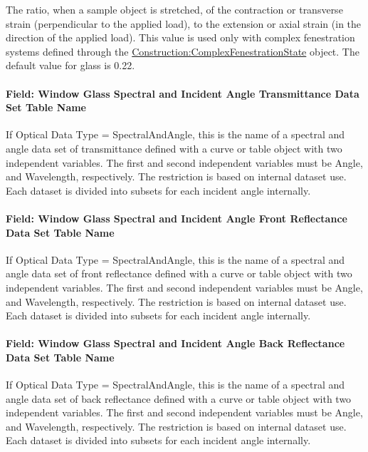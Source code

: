 The ratio, when a sample object is stretched, of the contraction or transverse strain (perpendicular to the applied load), to the extension or axial strain (in the direction of the applied load). This value is used only with complex fenestration systems defined through the \hyperref[constructioncomplexfenestrationstate]{Construction:ComplexFenestrationState} object. The default value for glass is 0.22.

\paragraph{Field: Window Glass Spectral and Incident Angle Transmittance Data Set Table Name}\label{field-window-glass-spectral-and-incident-angle-transmittance-data}

If Optical Data Type = SpectralAndAngle, this is the name of a spectral and angle data set of transmittance defined with a curve or table object with two independent variables. The first and second independent variables must be Angle, and Wavelength, respectively. The restriction is based on internal dataset use. Each dataset is divided into subsets for each incident angle internally.

\paragraph{Field: Window Glass Spectral and Incident Angle Front Reflectance Data Set Table Name}\label{field-window-glass-spectral-and-incident-angle-front-reflectance-data}

If Optical Data Type = SpectralAndAngle, this is the name of a spectral and angle data set of front reflectance defined with a curve or table object with two independent variables. The first and second independent variables must be Angle, and Wavelength, respectively. The restriction is based on internal dataset use. Each dataset is divided into subsets for each incident angle internally.

\paragraph{Field: Window Glass Spectral and Incident Angle Back Reflectance Data Set Table Name}\label{field-window-glass-spectral-and-incident-angle-back-reflectance-data}

If Optical Data Type = SpectralAndAngle, this is the name of a spectral and angle data set of back reflectance defined with a curve or table object with two independent variables. The first and second independent variables must be Angle, and Wavelength, respectively. The restriction is based on internal dataset use. Each dataset is divided into subsets for each incident angle internally.

